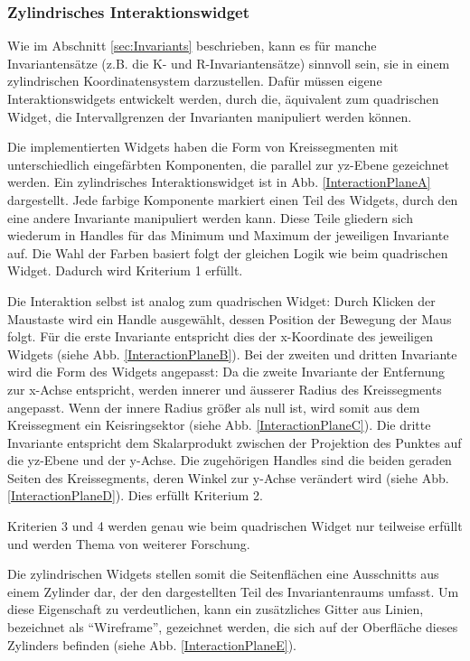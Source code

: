 \documentclass[a4paper,fontsize=12pt,toc=bib,halfparskip]{scrartcl}
\begin{document}
\subsubsection{Zylindrisches Interaktionswidget}
Wie im Abschnitt \ref{sec:Invariants} beschrieben, kann es f\"ur manche Invariantens\"atze (z.B. die K- und R-Invariantens\"atze) sinnvoll sein, sie in einem zylindrischen Koordinatensystem darzustellen. Daf\"ur m\"ussen eigene Interaktionswidgets entwickelt werden, durch die, \"aquivalent zum quadrischen Widget, die Intervallgrenzen der Invarianten manipuliert werden k\"onnen.

Die implementierten Widgets haben die Form von Kreissegmenten mit unterschiedlich eingef\"arbten Komponenten, die parallel zur yz-Ebene gezeichnet werden. Ein zylindrisches Interaktionswidget ist in Abb. \ref{InteractionPlaneA} dargestellt. Jede farbige Komponente markiert einen Teil des Widgets, durch den eine andere Invariante manipuliert werden kann. Diese Teile gliedern sich wiederum in Handles f\"ur das Minimum und Maximum der jeweiligen Invariante auf. Die Wahl der Farben basiert folgt der gleichen Logik wie beim quadrischen Widget. Dadurch wird Kriterium 1 erf\"ullt.

Die Interaktion selbst ist analog zum quadrischen Widget: Durch Klicken der Maustaste wird ein Handle ausgew\"ahlt, dessen Position der Bewegung der Maus folgt. F\"ur die erste Invariante entspricht dies der x-Koordinate des jeweiligen Widgets (siehe Abb. \ref{InteractionPlaneB}). Bei der zweiten und dritten Invariante wird die Form des Widgets angepasst: Da die zweite Invariante der Entfernung zur x-Achse entspricht, werden innerer und \"ausserer Radius des Kreissegments angepasst. Wenn der innere Radius gr\"o{\ss}er als null ist, wird somit aus dem Kreissegment ein Keisringsektor (siehe Abb. \ref{InteractionPlaneC}). Die dritte Invariante entspricht dem Skalarprodukt zwischen der Projektion des Punktes auf die yz-Ebene und der y-Achse. Die zugeh\"origen Handles sind die beiden geraden Seiten des Kreissegments, deren Winkel zur y-Achse ver\"andert wird (siehe Abb. \ref{InteractionPlaneD}). Dies erf\"ullt Kriterium 2.

Kriterien 3 und 4 werden genau wie beim quadrischen Widget nur teilweise erf\"ullt und werden Thema von weiterer Forschung.

Die zylindrischen Widgets stellen somit die Seitenfl\"achen eine Ausschnitts aus einem Zylinder dar, der den dargestellten Teil des Invariantenraums umfasst. Um diese Eigenschaft zu verdeutlichen, kann ein zus\"atzliches Gitter aus Linien, bezeichnet als ``Wireframe'', gezeichnet werden, die sich auf der Oberfl\"ache dieses Zylinders befinden (siehe Abb. \ref{InteractionPlaneE}).
\end{document}
